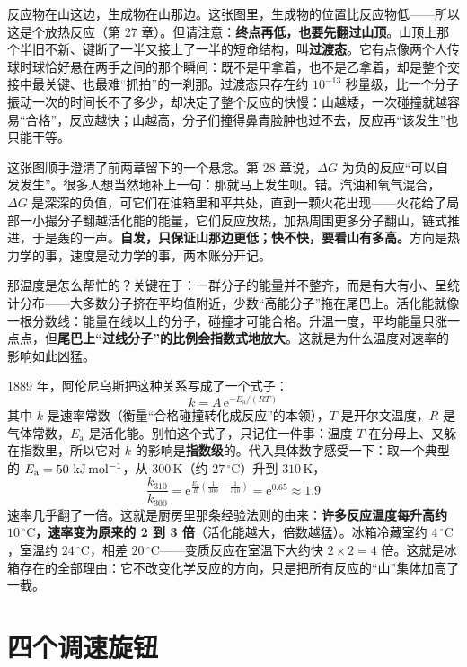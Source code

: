 反应物在山这边，生成物在山那边。这张图里，生成物的位置比反应物低——所以这是个放热反应（第 27 章）。但请注意：\textbf{终点再低，也要先翻过山顶}。山顶上那个半旧不新、键断了一半又接上了一半的短命结构，叫\textbf{过渡态}。它有点像两个人传球时球恰好悬在两手之间的那个瞬间：既不是甲拿着，也不是乙拿着，却是整个交接中最关键、也最难“抓拍”的一刹那。过渡态只存在约 $10^{-13}$ 秒量级，比一个分子振动一次的时间长不了多少，却决定了整个反应的快慢：山越矮，一次碰撞就越容易“合格”，反应越快；山越高，分子们撞得鼻青脸肿也过不去，反应再“该发生”也只能干等。

这张图顺手澄清了前两章留下的一个悬念。第 28 章说，$\Delta G$ 为负的反应“可以自发发生”。很多人想当然地补上一句：那就马上发生呗。错。汽油和氧气混合，$\Delta G$ 是深深的负值，可它们在油箱里和平共处，直到一颗火花出现——火花给了局部一小撮分子翻越活化能的能量，它们反应放热，加热周围更多分子翻山，链式推进，于是轰的一声。\textbf{自发，只保证山那边更低；快不快，要看山有多高。}方向是热力学的事，速度是动力学的事，两本账分开记。

那温度是怎么帮忙的？关键在于：一群分子的能量并不整齐，而是有大有小、呈统计分布——大多数分子挤在平均值附近，少数“高能分子”拖在尾巴上。活化能就像一根分数线：能量在线以上的分子，碰撞才可能合格。升温一度，平均能量只涨一点点，但\textbf{尾巴上“过线分子”的比例会指数式地放大}。这就是为什么温度对速率的影响如此凶猛。

\begin{qiaoliang}
1889 年，阿伦尼乌斯把这种关系写成了一个式子：
\[k = A\,\mathrm{e}^{-E_{\mathrm{a}}/(RT)}\]
其中 $k$ 是速率常数（衡量“合格碰撞转化成反应”的本领），$T$ 是开尔文温度，$R$ 是气体常数，$E_{\mathrm{a}}$ 是活化能。别怕这个式子，只记住一件事：温度 $T$ 在分母上、又躲在指数里，所以它对 $k$ 的影响是\textbf{指数级}的。代入具体数字感受一下：取一个典型的 $E_{\mathrm{a}} = 50\ \mathrm{kJ\,mol^{-1}}$，从 $300\,\mathrm{K}$（约 $27\,^{\circ}\mathrm{C}$）升到 $310\,\mathrm{K}$，
\[\frac{k_{310}}{k_{300}} = \mathrm{e}^{\frac{E_{\mathrm{a}}}{R}\left(\frac{1}{300}-\frac{1}{310}\right)} = \mathrm{e}^{0.65} \approx 1.9\]
速率几乎翻了一倍。这就是厨房里那条经验法则的由来：\textbf{许多反应温度每升高约 $10\,^{\circ}\mathrm{C}$，速率变为原来的 2 到 3 倍}（活化能越大，倍数越猛）。冰箱冷藏室约 $4\,^{\circ}\mathrm{C}$，室温约 $24\,^{\circ}\mathrm{C}$，相差 $20\,^{\circ}\mathrm{C}$——变质反应在室温下大约快 $2\times 2=4$ 倍。这就是冰箱存在的全部理由：它不改变化学反应的方向，只是把所有反应的“山”集体加高了一截。
\end{qiaoliang}

\section{四个调速旋钮}

